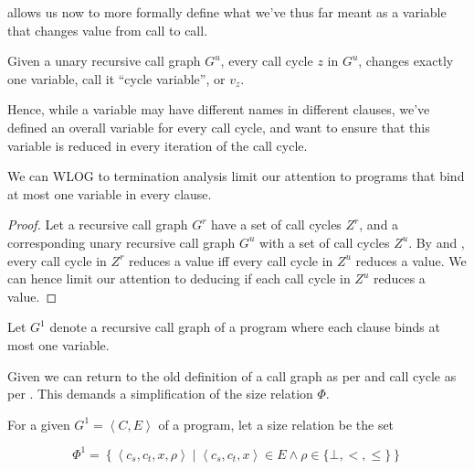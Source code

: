  allows us now to more formally define
what we've thus far meant as a variable that changes value from call to call.

\begin{definition}\label{definition:variable} Given a unary recursive call
graph $G^u$, every call cycle $z$ in $G^u$, changes exactly one variable, call
it ``cycle variable'', or $v_z$.\end{definition}

Hence, while a variable may have different names in different clauses, we've
defined an overall variable for every call cycle, and want to ensure that this
variable is reduced in every iteration of the call cycle.

\begin{theorem}\label{theorem:multivariable-patterns} We can WLOG to
termination analysis limit our attention to programs that bind at most one
variable in every clause.\end{theorem}

\begin{proof} Let a recursive call graph $G^r$ have a set of call cycles $Z^r$,
and a corresponding unary recursive call graph $G^u$ with a set of call cycles
$Z^u$. By  and
, every call cycle in $Z^r$ reduces a value
iff every call cycle in $Z^u$ reduces a value. We can hence limit our attention
to deducing if each call cycle in $Z^u$ reduces a value.\end{proof}

\begin{definition}\label{definition:nice-call-graph} Let $G^1$ denote a
recursive call graph of a program where each clause binds at most one
variable.\end{definition}

Given  we can return to the old
definition of a call graph as per  and
call cycle as per . This demands a
simplification of the size relation $\Phi$.

\begin{definition}\label{definition:unary-size-relation} For a given $G^1 =
\left\langle C,E \right\rangle$ of a program, let a size relation be the set

$$\Phi^1 = \left\{ \left\langle c_s, c_t,x, \rho \right\rangle \mid
\left\langle c_s, c_t,x \right\rangle \in E \wedge \rho\in\{\bot, <, \leq\}
\right\}$$

\end{definition}

